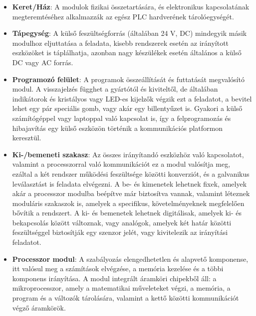 \begin{itemize}
	\item \textbf{Keret/Ház}: A modulok fizikai összetartására, és elektronikus kapcsolatának megteremtéséhez alkalmazzák az egész PLC hardverének tárolóegységét.
	\item \textbf{Tápegység}: A külső feszültségforrás (általában 24 V, DC) mindegyik másik modulhoz eljuttatása a feladata, kisebb rendszerek esetén az irányított eszközöket is táplálhatja, azonban nagy készülékek esetén általános a külső DC vagy AC forrás.
	\item \textbf{Programozó felület}: A programok összeállítását és futtatását megvalósító modul. A visszajelzés függhet a gyártótól és kiviteltől, de általában indikátorok és kristályos vagy LED-es kijelzők végzik ezt a feladatot, a bevitel lehet egy pár speciális gomb, vagy akár egy billentyűzet is. Gyakori a külső számítógéppel vagy laptoppal való kapcsolat is, így a felprogramozás és hibajavítás egy külső eszközön történik a kommunikációs platformon keresztül.
	\item \textbf{Ki-/bemeneti szakasz}: Az összes irányítandó eszközhöz való kapcsolatot, valamint a processzorral való kommunikációt ez a modul valósítja meg, ezáltal a két rendszer működési feszültsége közötti konverziót, és a galvanikus leválasztást is feladata elvégezni. A be- és kimenetek lehetnek fixek, amelyek akár a processzor modulba beépítve már biztosítva vannak, valamint léteznek moduláris szakaszok is, amelyek a specifikus, követelményeknek megfelelően bővítik a rendszert. A ki- és bemenetek lehetnek digitálisak, amelyek ki- és bekapcsolás között változnak, vagy analógok, amelyek két határ közötti feszültséggel biztosítják egy szenzor jelét, vagy kivitelezik az irányítási feladatot.
	\item \textbf{Processzor modul}: A szabályozás elengedhetetlen és alapvető komponense, itt valósul meg a számítások elvégzése, a memória kezelése és a többi komponens irányítása. A modul integrált áramköri chipekből áll: a mikroprocesszor, amely a matematikai műveleteket végzi, a memória, a program és a változók tárolására, valamint a kettő közötti kommunikációt végző áramkörök.
\end{itemize}
